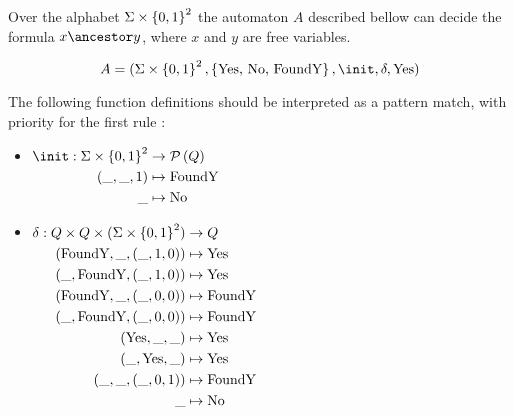 \documentclass{article}
\begin{document}
\begin{lemma}
	Over the alphabet $\Sigma \times \left\{0,1\right\}^2$ the automaton $A$ described bellow can decide the formula $x  \ancestor y $,
	where $x$ and $y$ are free variables.

	\[A = (\Sigma \times \set {0,1}^2, \set {\text {Yes, No, FoundY}},  \init, \delta, \text{Yes})\]

	The following function definitions should be interpreted as a pattern match, with priority for the first rule :

	\begin{itemize}
		\item $\begin{aligned}[t]
				      \init      : \Sigma \times \set{0,1}^2 & \to \parts Q          \\
				      (\_, \_, 1)                            & \mapsto \text{FoundY} \\
				      \_                                     & \mapsto \text{No}
			      \end{aligned} $

		\item $\begin{aligned}[t]
				      \delta               : Q \times Q \times (\Sigma \times \left\{0,1\right\}^2) & \to Q                 \\
				      (\text{FoundY}, \_, (\_,1,0))                                         & \mapsto \text{Yes}    \\
				      (\_, \text{FoundY}, (\_,1,0))                                         & \mapsto \text{Yes}    \\
				      (\text{FoundY}, \_, (\_,0,0))                                         & \mapsto \text{FoundY} \\
				      (\_, \text{FoundY}, (\_,0,0))                                         & \mapsto \text{FoundY} \\
				      (\text{Yes}, \_, \_)                                                  & \mapsto \text{Yes}    \\
				      (\_, \text{Yes}, \_)                                                  & \mapsto \text{Yes}    \\
				      (\_, \_, (\_, 0, 1))                                                  & \mapsto \text{FoundY} \\
				      \_                                                                    & \mapsto \text{No}
			      \end{aligned}$
	\end{itemize}
\end{lemma}
\end{document}
